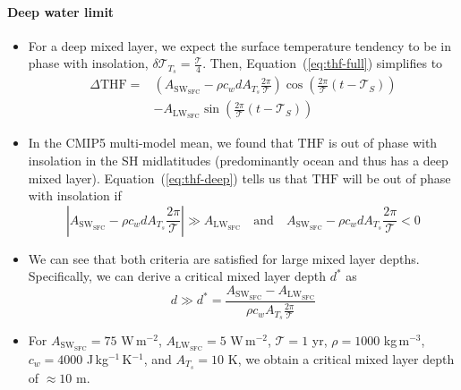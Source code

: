 \documentclass{ametsocV5}
\begin{document}
  \paragraph{Deep water limit}
  \begin{itemize}
  \item For a deep mixed layer, we expect the surface temperature tendency to be in phase with insolation, $\delta\mathscr{T}_{T_{s}} = \frac{\mathcal{T}}{4}$. Then, Equation~(\ref{eq:thf-full}) simplifies to
        \begin{equation} \label{eq:thf-deep}
          \begin{aligned}
            \Delta \mathrm{THF} =& \left( A_{\mathrm{SW_{SFC}}} - \rho c_{w} d A_{T_{s}}\frac{2\pi}{\mathcal{T}} \right) \cos\left(\frac{2\pi}{\mathcal{T}}(t-\mathscr{T}_{S})\right) \\
            &- A_{\mathrm{LW_{SFC}}} \sin\left(\frac{2\pi}{\mathcal{T}}(t-\mathscr{T}_{S})\right)
          \end{aligned}
        \end{equation}
  \item In the CMIP5 multi-model mean, we found that $\mathrm{THF}$ is out of phase with insolation in the SH midlatitudes (predominantly ocean and thus has a deep mixed layer). Equation~(\ref{eq:thf-deep}) tells us that $\mathrm{THF}$ will be out of phase with insolation if
        \begin{equation} \label{eq:d-deep}
          \left|A_{\mathrm{SW_{SFC}}} - \rho c_{w}d A_{T_{s}}\frac{2\pi}{\mathcal{T}}\right| \gg A_{\mathrm{LW_{SFC}}} \quad \text{and} \quad A_{\mathrm{SW_{SFC}}} - \rho c_{w}d A_{T_{s}}\frac{2\pi}{\mathcal{T}} < 0
        \end{equation}
  \item We can see that both criteria are satisfied for large mixed layer depths. Specifically, we can derive a critical mixed layer depth $d^{*}$ as
        \begin{equation}
          d \gg d^{*} = \frac{A_{\mathrm{SW_{SFC}}}-A_{\mathrm{LW_{SFC}}}}{\rho c_{w} A_{T_{s}}\frac{2\pi}{\mathcal{T}}}
        \end{equation}
  \item For $A_{\mathrm{SW_{SFC}}}=75$ W$\,$m$^{-2}$, $A_{\mathrm{LW_{SFC}}}=5$ W$\,$m$^{-2}$, $\mathcal{T}=1$ yr, $\rho=1000$ kg$\,$m$^{-3}$, $c_{w}=4000$ J$\,$kg$^{-1}$$\,$K$^{-1}$, and $A_{T_{s}}=10$ K, we obtain a critical mixed layer depth of $\approx 10$ m.
  \end{itemize}
\end{document}
